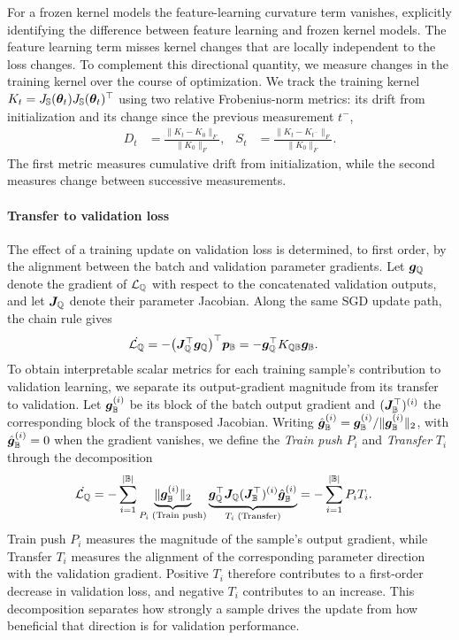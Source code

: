 \documentclass[10pt]{article} %
\newcommand{\genloss}{\mathcal{L}_{\sQ}}
\begin{document}
For a frozen kernel models the feature-learning curvature term vanishes, explicitly identifying the difference between feature learning and frozen kernel models. The feature learning term misses kernel changes that are locally independent to the loss changes.  To complement this directional quantity, we measure changes in the training kernel over the course of optimization. We track the training kernel $K_t=J_{{\mathbb{S}}}({\bm{\theta}}_t)J_{{\mathbb{S}}}({\bm{\theta}}_t)^\top$ using two relative Frobenius-norm metrics: its drift from initialization and its change since the previous measurement $t^-$,
\begin{align}
    D_t &= \frac{\|K_t-K_0\|_F}{\|K_0\|_F}, &
    S_t &= \frac{\|K_t-K_{t^-}\|_F}{\|K_0\|_F}.
\end{align}
The first metric measures cumulative drift from initialization, while the second measures change between successive measurements.


\paragraph{Transfer to validation loss}
The effect of a training update on validation loss is determined, to first order, by the alignment between the batch and validation parameter gradients. Let ${\bm{g}}_{\mathbb{Q}}$ denote the gradient of $\genloss$ with respect to the concatenated validation outputs, and let ${\bm{J}}_{\mathbb{Q}}$ denote their parameter Jacobian. Along the same SGD update path, the chain rule gives 
\begin{align}
    \dot{\genloss}
    &= -\bigl(\mJ_\sQ^\top\vg_\sQ\bigr)^\top\vp_\sB
     = -\vg_\sQ^\top K_{\sQ\sB}\vg_\sB.
    \label{eq:validation-transfer}
\end{align}
To obtain interpretable scalar metrics for each training sample's contribution to validation learning, we separate its output-gradient magnitude from its transfer to validation. Let ${\bm{g}}_{\mathbb{B}}^{(i)}$ be its block of the batch output gradient and $({\bm{J}}_{\mathbb{B}}^\top)^{(i)}$ the corresponding block of the transposed Jacobian. Writing $\hat{{\bm{g}}}_{\mathbb{B}}^{(i)} = {\bm{g}}_{\mathbb{B}}^{(i)}/\|{\bm{g}}_{\mathbb{B}}^{(i)}\|_2$, with $\hat{{\bm{g}}}_{\mathbb{B}}^{(i)}=0$ when the gradient vanishes, we define the \emph{Train push} $P_i$ and \emph{Transfer} $T_i$ through the decomposition
\begin{align}
    \dot{\genloss}
    &= -\sum_{i=1}^{|\sB|}
    \underbrace{\|\vg_\sB^{(i)}\|_2}_{P_i\;\text{(Train push)}}
    \underbrace{
        \vg_\sQ^\top\mJ_\sQ
        (\mJ_\sB^\top)^{(i)}
        \hat{\vg}_\sB^{(i)}
    }_{T_i\;\text{(Transfer)}} = -\sum_{i=1}^{|\sB|} P_i T_i.
    \label{eq:per-sample-transfer}
\end{align}
Train push $P_i$ measures the magnitude of the sample's output gradient, while Transfer $T_i$ measures the alignment of the corresponding parameter direction with the validation gradient. Positive $T_i$ therefore contributes to a first-order decrease in validation loss, and negative $T_i$ contributes to an increase. This decomposition separates how strongly a sample drives the update from how beneficial that direction is for validation performance.
\end{document}
